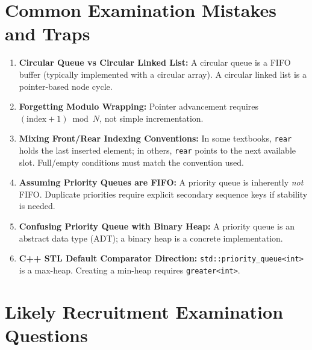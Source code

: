 \section{Common Examination Mistakes and Traps}

\begin{enumerate}
    \item \textbf{Circular Queue vs Circular Linked List:} A circular queue is a FIFO buffer (typically implemented with a circular array). A circular linked list is a pointer-based node cycle.
    \item \textbf{Forgetting Modulo Wrapping:} Pointer advancement requires $(\text{index} + 1) \bmod N$, not simple incrementation.
    \item \textbf{Mixing Front/Rear Indexing Conventions:} In some textbooks, \texttt{rear} holds the last inserted element; in others, \texttt{rear} points to the next available slot. Full/empty conditions must match the convention used.
    \item \textbf{Assuming Priority Queues are FIFO:} A priority queue is inherently \emph{not} FIFO. Duplicate priorities require explicit secondary sequence keys if stability is needed.
    \item \textbf{Confusing Priority Queue with Binary Heap:} A priority queue is an abstract data type (ADT); a binary heap is a concrete implementation.
    \item \textbf{C++ STL Default Comparator Direction:} \texttt{std::priority\_queue<int>} is a max-heap. Creating a min-heap requires \texttt{greater<int>}.
\end{enumerate}

\section{Likely Recruitment Examination Questions}

